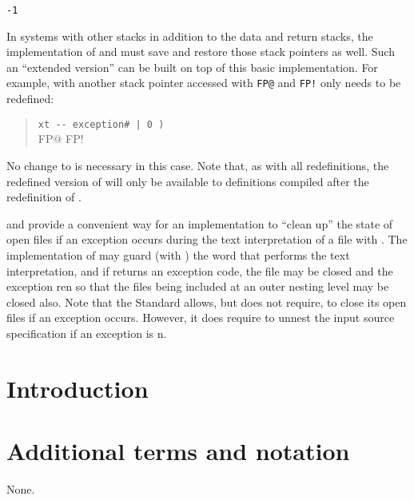 \begin{info}
\tab \word{:} 
	\texttt{-1} 
\word{;}

In systems with other stacks in addition to the data and return stacks,
the implementation of  and 
must save and restore those stack pointers as well. Such an ``extended
version'' can be built on top of this basic implementation. For example,
with another stack pointer accessed with \texttt{FP@} and \texttt{FP!}
only  needs to be redefined:

\begin{quote}\ttfamily
	\word{:} 
		 \texttt{xt -{}- exception\# | 0 )} \\
	\tab FP@   
		  FP!   
	\word{;}
\end{quote}

No change to  is necessary in this case. Note that, as
with all redefinitions, the redefined version of  will
only be available to definitions compiled after the redefinition of
.

 and  provide a convenient way for an
implementation to ``clean up'' the state of open files if an
exception occurs during the text interpretation of a file with
. The implementation of
 may guard (with ) the word
that performs the text interpretation, and if  returns
an exception code, the file may be closed and the exception
ren so that the files being included at an outer nesting
level may be closed also. Note that the Standard allows, but does not
require,  to close its open files if an
exception occurs. However, it does require 
to unnest the input source specification if an exception is
n.
\end{info}

\section{Introduction} %

\section{Additional terms and notation} %
None.

